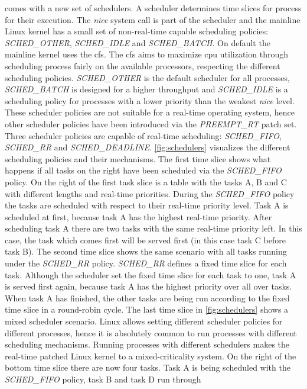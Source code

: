 \documentclass[titlepage]{report}
\begin{document}
comes with a new set of schedulers. A scheduler determines time slices for process for their execution. The \emph{nice} system call is part of the scheduler and the mainline Linux kernel has a small set of non-real-time capable scheduling
policies: \emph{SCHED\_OTHER}, \emph{SCHED\_IDLE} and \emph{SCHED\_BATCH}. On default the mainline kernel uses the \gls{cfs}\cite{man7}. The \gls{cfs} aims to maximize \gls{cpu} utilization through scheduling process fairly
on the available processors, respecting the different scheduling policies. \emph{SCHED\_OTHER} is the default scheduler for all processes, \emph{SCHED\_BATCH} is designed for a higher throughput and \emph{SCHED\_IDLE} is
a scheduling policy for processes with a lower priority than the weakest \emph{nice} level\cite{schedPolicies}. These scheduler policies are not suitable for a real-time operating system, hence other scheduler policies have been
introduced via the \emph{PREEMPT\_RT} patch set. Three scheduler policies are capable of real-time scheduling: \emph{SCHED\_FIFO}, \emph{SCHED\_RR} and \emph{SCHED\_DEADLINE}. \autoref{fig:schedulers} visualizes the different
scheduling policies and their mechanisms. The first time slice shows what happens if all tasks on the right have been scheduled via the \emph{SCHED\_FIFO} policy. On the right of the first task slice is a table with the tasks
A, B and C with different lengths and real-time priorities. During the \emph{SCHED\_FIFO} policy the tasks are scheduled with respect to their real-time priority level. Task A is scheduled at first, because task A has the highest
real-time priority. After scheduling task A there are two tasks with the same real-time priority left. In this case, the task which comes first will be served first (in this case task C before task B). The second time slice
shows the same scenario with all tasks running under the \emph{SCHED\_RR} policy. \emph{SCHED\_RR} defines a fixed time slice for each task. Although the scheduler set the fixed time slice for each task to one, task A is served
first again, because task A has the highest priority over all over tasks. When task A has finished, the other tasks are being run according to the fixed time slice in a round-robin cycle. The last time slice in \autoref{fig:schedulers}
shows a mixed scheduler scenario. Linux allows setting different scheduler policies for different processes, hence it is absolutely common to run processes with different scheduling mechanisms. Running processes with different schedulers
makes the real-time patched Linux kernel to a mixed-criticality system. On the right of the bottom time slice there are now four tasks. Task A is being scheduled with the \emph{SCHED\_FIFO} policy,  task B and task D run through
\end{document}
